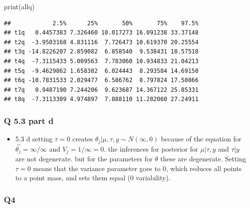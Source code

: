 \documentclass[
]{book}
\newenvironment{Shaded}{\begin{snugshade}}{\end{snugshade}}
\newcommand{\FunctionTok}[1]{\textcolor[rgb]{0.00,0.00,0.00}{#1}}
\newcommand{\NormalTok}[1]{#1}
\providecommand{\tightlist}{%
  \setlength{\itemsep}{0pt}\setlength{\parskip}{0pt}}
\theoremstyle{definition}
\theoremstyle{definition}
\theoremstyle{definition}
\theoremstyle{definition}
\theoremstyle{remark}
\begin{document}
\begin{Shaded}
\begin{Highlighting}[]
\FunctionTok{print}\NormalTok{(allq)}
\end{Highlighting}
\end{Shaded}

\begin{verbatim}
##            2.5%      25%       50%       75%    97.5%
## t1q   0.4457383 7.326460 10.017273 16.091238 33.37148
## t2q  -3.9503168 4.831116  7.726473 10.619370 20.25554
## t3q -14.8226207 2.859082  6.858540  9.538431 18.57518
## t4q  -7.3115433 5.009563  7.783060 10.934833 21.04213
## t5q  -9.4629862 1.658382  6.024443  8.293584 14.69150
## t6q -10.7831533 2.029477  6.586762  8.797824 17.50866
## t7q   0.9487190 7.244206  9.623687 14.367122 25.85331
## t8q  -7.3113309 4.974897  7.888110 11.282060 27.24911
\end{verbatim}

\hypertarget{q-5.3-part-d}{%
\subsubsection{Q 5.3 part d}\label{q-5.3-part-d}}

\begin{itemize}
\tightlist
\item
  5.3 d
  setting \(\tau =0\) creates \(\theta_j | \mu, \tau, y \sim N(\infty, 0)\) because of the equation for \(\hat{\theta_j} = \infty/\infty\) and \(V_j = 1/\infty =0\). the inferences for posterior for \(\mu | \tau, y\) and \(\tau | y\) are not degenerate. but for the parameters for \(\theta\) these are degenerate. Setting \(\tau =0\) means that the variance parameter goes to 0, which reduces all points to a point mass, and sets them equal (0 variability).
\end{itemize}

\hypertarget{q4}{%
\subsubsection*{Q4}\label{q4}}
\end{document}
